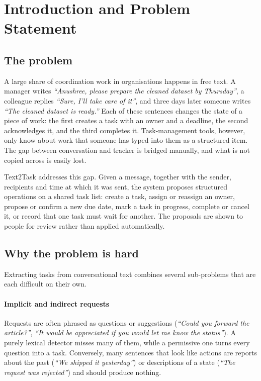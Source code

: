 \chapter{Introduction and Problem Statement}
\label{ch:intro}

\section{The problem}
A large share of coordination work in organisations happens in free text. A manager writes \emph{``Anushree, please prepare the cleaned dataset by Thursday''}, a colleague replies \emph{``Sure, I'll take care of it''}, and three days later someone writes \emph{``The cleaned dataset is ready.''} Each of these sentences changes the state of a piece of work: the first creates a task with an owner and a deadline, the second acknowledges it, and the third completes it. Task-management tools, however, only know about work that someone has typed into them as a structured item. The gap between conversation and tracker is bridged manually, and what is not copied across is easily lost.

Text2Task addresses this gap. Given a message, together with the sender, recipients and time at which it was sent, the system proposes structured operations on a shared task list: create a task, assign or reassign an owner, propose or confirm a new due date, mark a task in progress, complete or cancel it, or record that one task must wait for another. The proposals are shown to people for review rather than applied automatically.

\section{Why the problem is hard}
Extracting tasks from conversational text combines several sub-problems that are each difficult on their own.

\subsubsection{Implicit and indirect requests}
Requests are often phrased as questions or suggestions (\emph{``Could you forward the article?''}, \emph{``It would be appreciated if you would let me know the status''}). A purely lexical detector misses many of them, while a permissive one turns every question into a task. Conversely, many sentences that look like actions are reports about the past (\emph{``We shipped it yesterday''}) or descriptions of a state (\emph{``The request was rejected''}) and should produce nothing.

